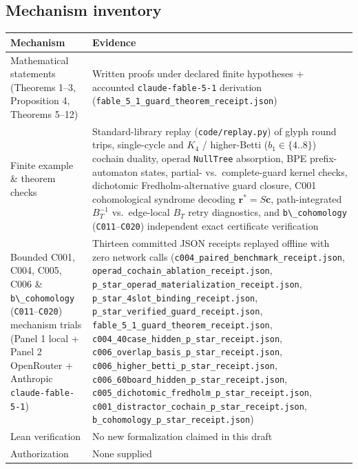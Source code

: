 \documentclass[
  11pt,
]{article}
\newcommand{\passthrough}[1]{#1}
\begin{document}
\subsection{Mechanism inventory}\label{mechanism-inventory}

\begin{longtable}[]{@{}
  >{\raggedright\arraybackslash}p{}
  >{\raggedright\arraybackslash}p{}@{}}
\toprule\noalign{}
\begin{minipage}[b]{\linewidth}\raggedright
Mechanism
\end{minipage} & \begin{minipage}[b]{\linewidth}\raggedright
Evidence
\end{minipage} \\
\midrule\noalign{}
\endhead
\bottomrule\noalign{}
\endlastfoot
Mathematical statements (Theorems 1--3, Proposition 4, Theorems 5--12) &
Written proofs under declared finite hypotheses + accounted
\nolinkurl{claude-fable-5-1} derivation
(\nolinkurl{fable_5_1_guard_theorem_receipt.json}) \\
Finite example \& theorem checks & Standard-library replay
(\nolinkurl{code/replay.py}) of glyph round trips, single-cycle and
\(K_4\) / higher-Betti (\(b_1 \in \{4..8\}\)) cochain duality, operad
\passthrough{\lstinline!NullTree!} absorption, BPE prefix-automaton
states, partial- vs.~complete-guard kernel checks, dichotomic
Fredholm-alternative guard closure, C001 cohomological syndrome decoding
\(\mathbf{r}^* = S\mathbf{c}\), path-integrated \(B_T^{-1}\)
vs.~edge-local \(B_T\) retry diagnostics, and
\passthrough{\lstinline!b\_cohomology!}
(\passthrough{\lstinline!C011!}--\passthrough{\lstinline!C020!})
independent exact certificate verification \\
Bounded C001, C004, C005, C006 \&
\passthrough{\lstinline!b\_cohomology!}
(\passthrough{\lstinline!C011!}--\passthrough{\lstinline!C020!})
mechanism trials (Panel 1 local + Panel 2 OpenRouter + Anthropic
\nolinkurl{claude-fable-5-1}) & Thirteen committed JSON receipts
replayed offline with zero network calls
(\nolinkurl{c004_paired_benchmark_receipt.json},
\nolinkurl{operad_cochain_ablation_receipt.json},
\nolinkurl{p_star_operad_materialization_receipt.json},
\nolinkurl{p_star_4slot_binding_receipt.json},
\nolinkurl{p_star_verified_guard_receipt.json},
\nolinkurl{fable_5_1_guard_theorem_receipt.json},
\nolinkurl{c004_40case_hidden_p_star_receipt.json},
\nolinkurl{c006_overlap_basis_p_star_receipt.json},
\nolinkurl{c006_higher_betti_p_star_receipt.json},
\nolinkurl{c006_60board_hidden_p_star_receipt.json},
\nolinkurl{c005_dichotomic_fredholm_p_star_receipt.json},
\nolinkurl{c001_distractor_cochain_p_star_receipt.json},
\nolinkurl{b_cohomology_p_star_receipt.json}) \\
Lean verification & No new formalization claimed in this draft \\
Authorization & None supplied \\
\end{longtable}
\end{document}
